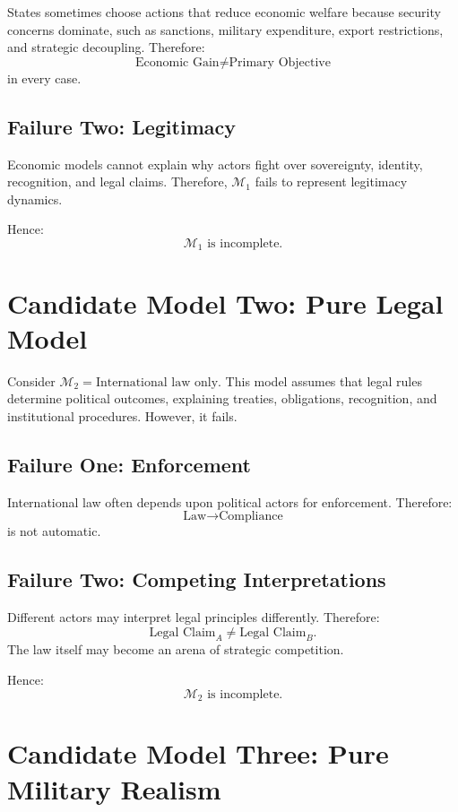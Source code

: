 \documentclass[11pt,openany]{book}
\theoremstyle{plain}
\theoremstyle{definition}
\begin{document}
States sometimes choose actions that reduce economic welfare because security concerns dominate, such as sanctions, military expenditure, export restrictions, and strategic decoupling. Therefore:
\[
\text{Economic Gain} \neq \text{Primary Objective}
\]
in every case.

\subsection*{Failure Two: Legitimacy}

Economic models cannot explain why actors fight over sovereignty, identity, recognition, and legal claims. Therefore, \(\mathcal{M}_1\) fails to represent legitimacy dynamics.

Hence:
\[
\boxed{
\mathcal{M}_1 \text{ is incomplete.}
}
\]

\section*{Candidate Model Two: Pure Legal Model}

Consider \(\mathcal{M}_2 = \text{International law only}\). This model assumes that legal rules determine political outcomes, explaining treaties, obligations, recognition, and institutional procedures. However, it fails.

\subsection*{Failure One: Enforcement}

International law often depends upon political actors for enforcement. Therefore:
\[
\text{Law} \longrightarrow \text{Compliance}
\]
is not automatic.

\subsection*{Failure Two: Competing Interpretations}

Different actors may interpret legal principles differently. Therefore:
\[
\text{Legal Claim}_A \neq \text{Legal Claim}_B.
\]
The law itself may become an arena of strategic competition.

Hence:
\[
\boxed{
\mathcal{M}_2 \text{ is incomplete.}
}
\]

\section*{Candidate Model Three: Pure Military Realism}
\end{document}
